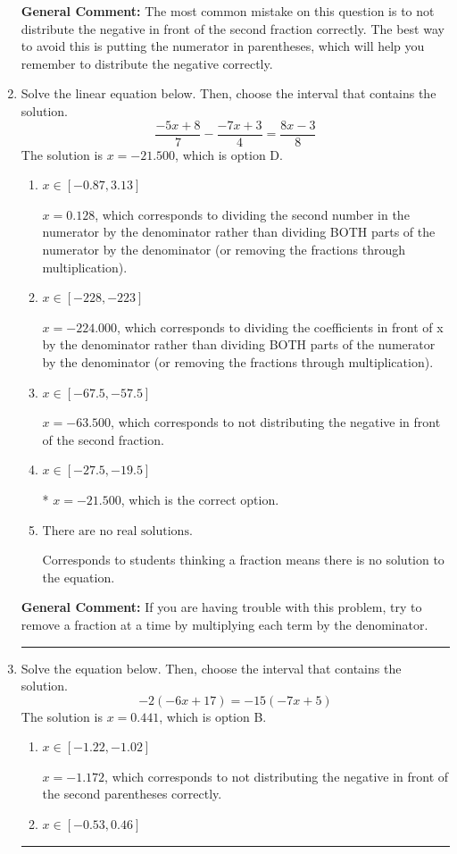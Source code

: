 \documentclass{extbook}[14pt]
\newcommand{\litem}[1]{\item #1

\rule{\textwidth}{0.4pt}}
\begin{document}
\begin{enumerate}
{\textbf{General Comment:} The most common mistake on this question is to not distribute the negative in front of the second fraction correctly. The best way to avoid this is putting the numerator in parentheses, which will help you remember to distribute the negative correctly.
}
\litem{
Solve the linear equation below. Then, choose the interval that contains the solution.
\[ \frac{-5x + 8}{7} - \frac{-7x + 3}{4} = \frac{8x -3}{8} \]The solution is \( x = -21.500 \), which is option D.\begin{enumerate}[label=\Alph*.]
\item \( x \in [-0.87, 3.13] \)

 $x = 0.128$, which corresponds to dividing the second number in the numerator by the denominator rather than dividing BOTH parts of the numerator by the denominator (or removing the fractions through multiplication).
\item \( x \in [-228, -223] \)

 $x = -224.000$, which corresponds to dividing the coefficients in front of x by the denominator rather than dividing BOTH parts of the numerator by the denominator (or removing the fractions through multiplication).
\item \( x \in [-67.5, -57.5] \)

 $x = -63.500$, which corresponds to not distributing the negative in front of the second fraction.
\item \( x \in [-27.5, -19.5] \)

* $x = -21.500$, which is the correct option.
\item \( \text{There are no real solutions.} \)

Corresponds to students thinking a fraction means there is no solution to the equation.
\end{enumerate}

\textbf{General Comment:} If you are having trouble with this problem, try to remove a fraction at a time by multiplying each term by the denominator.
}
\litem{
Solve the equation below. Then, choose the interval that contains the solution.
\[ -2(-6x + 17) = -15(-7x + 5) \]The solution is \( x = 0.441 \), which is option B.\begin{enumerate}[label=\Alph*.]
\item \( x \in [-1.22, -1.02] \)

$x = -1.172$, which corresponds to not distributing the negative in front of the second parentheses correctly.
\item \( x \in [-0.53, 0.46] \)


\end{enumerate}}
\end{enumerate}
\end{document}
